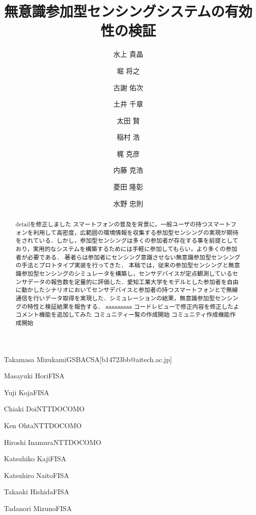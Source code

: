 \documentclass[submit,techrep]{ipsj}
\begin{document}
\title{無意識参加型センシングシステムの有効性の検証}






\author{水上 貴晶}{Takamasa Mizukami}{GSBACSA}[b14723bb@aitech.ac.jp]
\author{堀 将之}{Masayuki Hori}{FISA}%
\author{古謝 佑次}{Yuji Koja}{FISA}%
\author{土井 千章}{Chiaki Doi}{NTTDOCOMO}%
\author{太田 賢}{Ken Ohta}{NTTDOCOMO}%
\author{稲村 浩}{Hiroshi Inamura}{NTTDOCOMO}%
\author{梶 克彦}{Katsuhiko Kaji}{FISA}%
\author{内藤 克浩}{Katsuhiro Naito}{FISA}%
\author{菱田 隆彰}{Takaaki Hishida}{FISA}%
\author{水野 忠則}{Tadanori Mizuno}{FISA}%


\begin{abstract}
detailを修正しました
スマートフォンの普及を背景に，一般ユーザの持つスマートフォンを利用して高密度，広範囲の環境情報を収集する参加型センシングの実現が期待をされている．しかし，参加型センシングは多くの参加者が存在する事を前提としており，実用的なシステムを構築するためには手軽に参加してもらい，より多くの参加者が必要である．
著者らは参加者にセンシング意識させない無意識参加型センシングの手法とプロトタイプ実装を行ってきた．
本稿では，従来の参加型センシングと無意識参加型センシングのシミュレータを構築し，センサデバイスが定点観測しているセンサデータの報告数を定量的に評価した．愛知工業大学をモデルとした参加者を自由に動かしたシナリオにおいてセンサデバイスと参加者の持つスマートフォンとで無線通信を行いデータ取得を実現した．シミュレーションの結果，無意識参加型センシングの特性と検証結果を報告する．
aaaaaaaaa
コードレビューで修正内容を修正したよ
コメント機能を追加してみた
コミュニティ一覧の作成開始
コミュニティ作成機能作成開始
\end{abstract}
\end{document}
